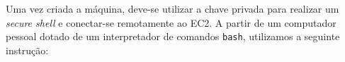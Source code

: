 %
%
%
%
%



Uma vez criada a máquina, deve-se utilizar a chave privada para realizar um \textit{secure shell} e conectar-se remotamente ao EC2. A partir de um computador pessoal dotado de um interpretador de comandos \texttt{bash}, utilizamos a seguinte instrução:

